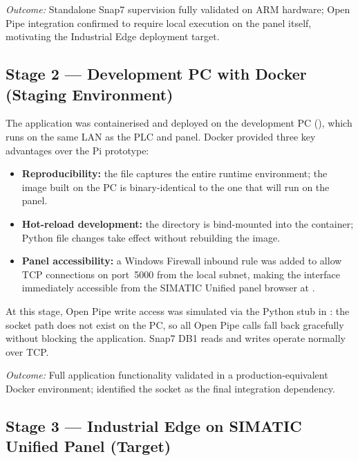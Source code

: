 \textit{Outcome:} Standalone Snap7 supervision fully validated on ARM hardware;
Open Pipe integration confirmed to require local execution on the panel itself,
motivating the Industrial Edge deployment target.

\subsection{Stage 2 --- Development PC with Docker (Staging Environment)}

The application was containerised and deployed on the development PC
(), which runs on the same LAN as the PLC and panel.
Docker provided three key advantages over the Pi prototype:
\begin{itemize}[leftmargin=*, itemsep=3pt]
  \item \textbf{Reproducibility:} the  file captures the entire
    runtime environment; the image built on the PC is binary-identical to the one that
    will run on the panel.
  \item \textbf{Hot-reload development:} the  directory is bind-mounted into
    the container; Python file changes take effect without rebuilding the image.
  \item \textbf{Panel accessibility:} a Windows Firewall inbound rule was added to allow
    TCP connections on port~5000 from the local subnet, making the interface immediately
    accessible from the SIMATIC Unified panel browser at .
\end{itemize}

At this stage, Open Pipe write access was simulated via the Python stub in
: the socket path  does not
exist on the PC, so all Open Pipe calls fall back gracefully without blocking the
application. Snap7 DB1 reads and writes operate normally over TCP.

\textit{Outcome:} Full application functionality validated in a production-equivalent
Docker environment; identified the  socket as the
final integration dependency.

\subsection{Stage 3 --- Industrial Edge on SIMATIC Unified Panel (Target)}

